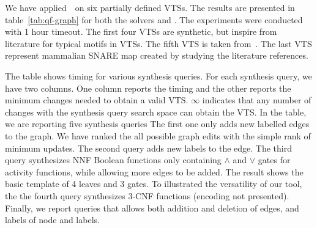 We have applied~\ourtool~on six partially defined VTSs.
%
The results are presented in table~\ref{tab:qf-graph} for both the solvers
\depqbf and \zthree.
%
%
The experiments were conducted with 1 hour timeout.
%
The first four VTSs are synthetic, but inspire from literature for
typical motifs in VTSs. 
%
%
The fifth VTS is taken from~\cite{burri2004complete}.
%
The last VTS represent mammalian SNARE map created by studying the literature references.  

The table shows timing for various synthesis queries.
%
For each synthesis query, we have two columns.
%
One column reports the timing and the other reports the minimum changes
needed to obtain a valid VTS.
%
$\infty$ indicates that any number of changes with the synthesis query
search space can obtain the VTS.
%
In the table, we are reporting five synthesis queries
%
The first one only adds new labelled edges to the graph.
%
We have ranked the all possible graph edits with the simple rank of
minimum updates.
%
The second query adds new labels to the edge.
%
The third query synthesizes NNF Boolean functions only containing
$\land$ and $\lor$ gates for activity functions, while allowing
more edges to be added.
%
The result shows the basic template of 4 leaves and 3 gates.
%
%
To illustrated the versatility of our tool, the the fourth query
synthesizes $3$-CNF functions (encoding not presented).
%
Finally, we report queries that allows both addition and deletion of edges, and labels
of node and labels. 
%
%



